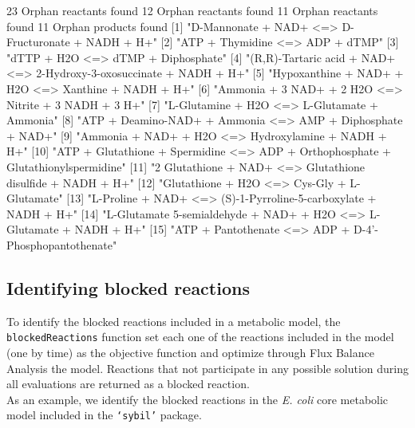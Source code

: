 \begin{Schunk}
\begin{Soutput}
23 Orphan reactants found
12 Orphan reactants found
11 Orphan reactants found
11 Orphan products found
 [1] "D-Mannonate + NAD+ <=> D-Fructuronate + NADH + H+"                               
 [2] "ATP + Thymidine <=> ADP + dTMP"                                                  
 [3] "dTTP + H2O <=> dTMP + Diphosphate"                                               
 [4] "(R,R)-Tartaric acid + NAD+ <=> 2-Hydroxy-3-oxosuccinate + NADH + H+"             
 [5] "Hypoxanthine + NAD+ + H2O <=> Xanthine + NADH + H+"                              
 [6] "Ammonia + 3 NAD+ + 2 H2O <=> Nitrite + 3 NADH + 3 H+"                            
 [7] "L-Glutamine + H2O <=> L-Glutamate + Ammonia"                                     
 [8] "ATP + Deamino-NAD+ + Ammonia <=> AMP + Diphosphate + NAD+"                       
 [9] "Ammonia + NAD+ + H2O <=> Hydroxylamine + NADH + H+"                              
[10] "ATP + Glutathione + Spermidine <=> ADP + Orthophosphate + Glutathionylspermidine"
[11] "2 Glutathione + NAD+ <=> Glutathione disulfide + NADH + H+"                      
[12] "Glutathione + H2O <=> Cys-Gly + L-Glutamate"                                     
[13] "L-Proline + NAD+ <=> (S)-1-Pyrroline-5-carboxylate + NADH + H+"                  
[14] "L-Glutamate 5-semialdehyde + NAD+ + H2O <=> L-Glutamate + NADH + H+"             
[15] "ATP + Pantothenate <=> ADP + D-4'-Phosphopantothenate"      
\end{Soutput}
\end{Schunk}

\subsection*{Identifying blocked reactions}
To identify the blocked reactions included in a metabolic model, the \texttt{blockedReactions} function set each one of the reactions included in the model (one by time) as the objective function and optimize through Flux Balance Analysis the model. Reactions that not participate in any possible solution during all evaluations are returned as a blocked reaction.\\

As an example, we identify the blocked reactions in the \emph{E. coli} core metabolic model included in the \texttt{`sybil'} package.

